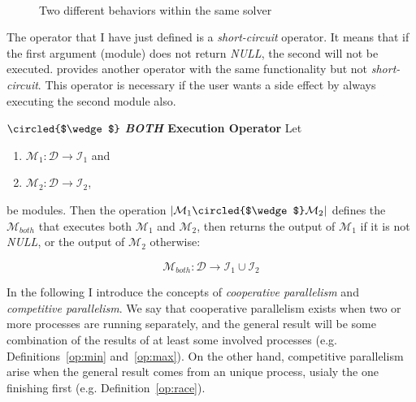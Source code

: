 \begin{figure}[h]
\centering
{}\\
\caption[]{Two different behaviors within the same solver}
\label{fig:2difBeh}
\end{figure}

\separation

The operator that I have just defined is a {\it short-circuit} operator. It means that if the first argument (module) does not return {\it NULL}, the second will not be executed. \posl{} provides another operator with the same functionality but not {\it short-circuit}. This operator is necessary if the user wants a side effect by always executing the second module also.

\begin{definition}\label{op:and}
$\circled{$\wedge$}$ {\bf {\it BOTH} Execution Operator} Let 
\begin{enumerate}%
	\item $\mathcal{M}_1 : \mathcal{D} \rightarrow \mathcal{I}_1$ and  
	\item $\mathcal{M}_2 : \mathcal{D} \rightarrow \mathcal{I}_2$,
\end{enumerate}%
be modules. %
Then the operation $\left|\mathcal{M}_1\circled{$\wedge$}\mathcal{M}_2\right|$ defines the \cm{} $\mathcal{M}_{both}$ that executes both $\mathcal{M}_1$ and $\mathcal{M}_2$, then returns the output of $\mathcal{M}_1$ if it is not {\it NULL}, or the output of $\mathcal{M}_2$ otherwise:

\[
\mathcal{M}_{both}:\mathcal{D} \rightarrow \mathcal{I}_1 \cup \mathcal{I}_2 
\]
\end{definition}

\separation

In the following I introduce the concepts of {\it cooperative parallelism} and {\it competitive parallelism}. We say that cooperative parallelism exists when two or more processes are running separately, and the general result will be some combination of the results of at least some involved processes (e.g. Definitions~\ref{op:min} and~\ref{op:max}). On the other hand, competitive parallelism arise when the general result comes from an unique process, usialy the one finishing first (e.g. Definition~\ref{op:race}).

